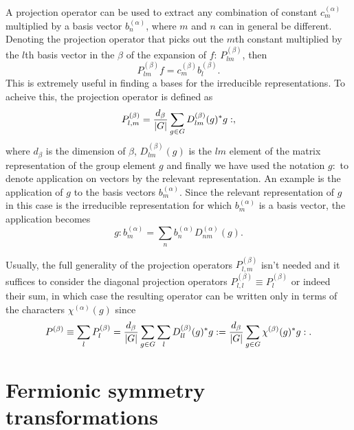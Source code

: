 A projection operator can be used to extract any combination of constant $c_m^{(\alpha)}$ multiplied by a basis vector $b^{(\alpha)}_n$, where
$m$ and $n$ can in general be different. Denoting the projection operator that picks out the $m$th constant multiplied by the $l$th basis vector
in the \irr $\beta$ of the expansion of $f$: $P^{(\beta)}_{lm}$, then
\begin{equation}
    \label{eq:Group:Irr:Pro:generalProApplication}
    P^{(\beta)}_{lm}f = c_m^{(\beta)}b_l^{(\beta)}.
\end{equation}
This is extremely useful in finding a bases for the irreducible representations.
To acheive this, the projection operator is defined as
\begin{equation}
    \label{eq:Group:Irr:Pro:proOpDef}
    P^{(\beta)}_{l,m} = \frac{d_\beta}{\lvert G \rvert}\sum_{g\in G}D_{lm}^{(\beta)}(g)^\ast g:,
\end{equation}
where $d_\beta$ is the dimension of \irr $\beta$, $D_{lm}^{(\beta)}(g)$ is the $lm$ element of the matrix representation of the group element $g$ and
finally we have used the notation $g:$ to denote application on vectors by the relevant representation. An example is the application of $g$ to the
basis vectors $b_m^{(\alpha)}$. Since the relevant representation of $g$ in this case is the irreducible representation for which $b_m^{(\alpha)}$ is
a basis vector, the application becomes
\begin{equation}
    \label{eq:Group:Irr:Pro:gApplication}
    g : b_m^{(\alpha)} = \sum_nb_n^{(\alpha)}D_{nm}^{(\alpha)}(g).
\end{equation}

Usually, the full generality of the
projection operators $P^{(\beta)}_{l,m}$ isn't needed and it suffices to consider the diagonal projection operators
$P^{(\beta)}_{l,l} \equiv P^{(\beta)}_l$ or indeed their sum, in which case the resulting operator can be written only in terms of the \irr characters
$\chi^{(\alpha)}(g)$ since
\begin{equation}
    \label{eq:Group:Irr:Pro:charPro}
    P^{(\beta)}\equiv\sum_lP^{(\beta)}_l = \frac{d_\beta}{\lvert G \rvert}\sum_{g\in G}\sum_lD_{ll}^{(\beta)}(g)^\ast g: = \frac{d_\beta}{\lvert G \rvert}\sum_{g\in G}\chi^{(\beta)}(g)^\ast g:.
\end{equation}


\section{Fermionic symmetry transformations}

